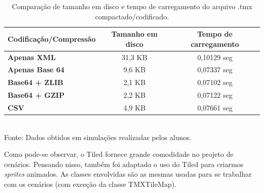 %
%
\begin{table}[ht]
\centering
\caption{Comparação de tamanho em disco e tempo de carregamento do arquivo .tmx compactado/codificado.}
\label{TabelaTiled}
\begin{tabular}{|l|c|c|}\hline
\textbf{Codificação/Compressão} & \textbf{Tamanho em disco} & \textbf{Tempo de carregamento}\\\hline
\textbf{Apenas XML} & 31,3 KB & 0,10129 seg\\\hline
\textbf{Apenas Base 64} & 9,6 KB & 0,07337 seg\\\hline
\textbf{Base64 + ZLIB} & 2,1 KB & 0,07102 seg\\\hline
\textbf{Base64 + GZIP} & 2,2 KB & 0,07122 seg\\\hline
\textbf{CSV} & 4,9 KB & 0,07661 seg\\\hline
\end{tabular}
\\Fonte: Dados obtidos em simulações realizadas pelos alunos.
\end{table}
%
\par 
Como pode-se observar, o Tiled fornece grande comodidade no projeto de cenários. Pensando nisso, também foi adaptado o uso do Tiled para criarmos \textit{sprites} animados. As classes envolvidas são as mesmas usadas para se trabalhar com os cenários (com exceção da classe TMXTileMap).
%
%
